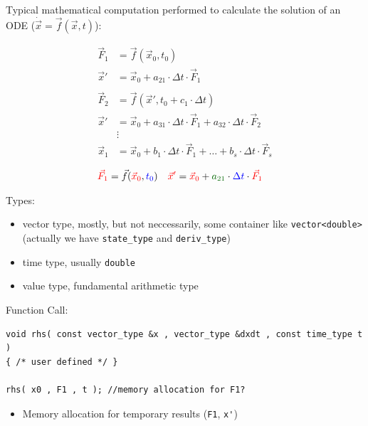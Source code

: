 \begin{frame}

 Typical mathematical computation performed to calculate the solution of an ODE ($\dot{\vec x} = \vec f(\vec x , t)$):

\begin{align*}
 \vec F_1 &= \vec f( \vec x_0 , t_0 ) \\
 \vec x' &= \vec x_0 + a_{21} \cdot \Delta t \cdot \vec F_1 \\ \\
 \vec F_2 &= \vec f( \vec x' , t_0 + c_1\cdot\Delta t ) \\
 \vec x' &= \vec x_0 + a_{31} \cdot \Delta t \cdot \vec F_1 + a_{32} \cdot \Delta t \cdot \vec F_2 \\
         &\vdots \\
 \vec x_1 &= \vec x_0 + b_1\cdot \Delta t \cdot \vec F_1 + \dots + b_s\cdot \Delta t \cdot \vec F_s
\end{align*} 

\end{frame}

\begin{frame}[fragile]
\begin{align*}
 {\color{red}\vec F_1} &= \vec f( {\color{red}\vec x_0} , {\color{blue}t_0} ) & %
 {\color{red}\vec x'} &= {\color{red}\vec x_0} + {\color{dark-green}a_{21}} \cdot {\color{blue}\Delta t} \cdot {\color{red}\vec F_1}
\end{align*}
 
Types:
\begin{itemize}
 \item {\color{red} vector type}, mostly, but not neccessarily, some container like \texttt{vector<double>} {\scriptsize (actually we have \texttt{state\_type} and \texttt{deriv\_type})}
 \item {\color{blue} time type}, usually \texttt{double}
 \item {\color{dark-green} value type}, fundamental arithmetic type
\end{itemize}
\pause
\vspace{0.5em}

Function Call:
\begin{lstlisting}
void rhs( const vector_type &x , vector_type &dxdt , const time_type t )
{ /* user defined */ }

rhs( x0 , F1 , t ); //memory allocation for F1?
\end{lstlisting}
\begin{itemize}
 \item Memory allocation for temporary results (\lstinline+F1+, \lstinline+x'+)
\end{itemize}

\end{frame}


